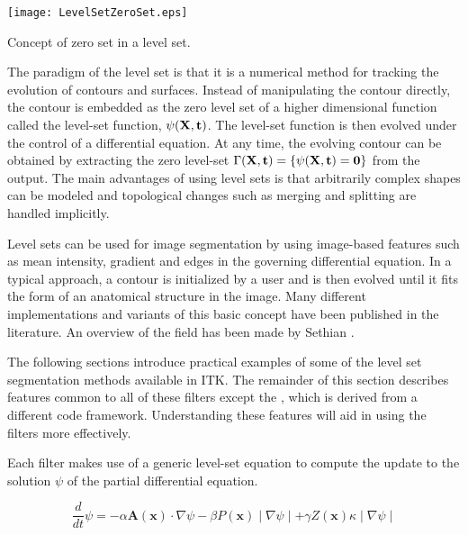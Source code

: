 %
%
%
%
%
%



\begin{floatingfigure}[rlp]{0.5\textwidth}
  \centering
  \texttt{[image: LevelSetZeroSet.eps]}
  \caption[Zero Set Concept]{Concept of zero set in a level set.\label{fig:LevelSetZeroSet}}
\end{floatingfigure}

The paradigm of the level set is that it is a numerical method for tracking
the evolution of contours and surfaces. Instead of manipulating the contour
directly, the contour is embedded as the zero level set of a higher
dimensional function called the level-set function, $\psi(\bf{X},t)$. The
level-set function is then evolved under the control of a differential
equation.  At any time, the evolving contour can be obtained by extracting
the zero level-set $\Gamma(\bf{X},t) =
\{\psi(\bf{X},t) = 0\}$ from the output.  The main advantages of using level
sets is that arbitrarily complex shapes can be modeled and topological
changes such as merging and splitting are handled implicitly.

Level sets can be used for image segmentation by using image-based features
such as mean intensity, gradient and edges in the governing differential
equation.  In a typical approach, a contour is initialized by a user and is
then evolved until it fits the form of an anatomical structure in the image.
Many different implementations and variants of this basic concept have been
published in the literature. An overview of the field has been made by
Sethian \cite{Sethian1996}.

The following sections introduce practical examples of some
of the level set segmentation methods available in ITK.  The remainder of this
section describes features common to all of these filters except the
, which is derived from a different code
framework.  Understanding these features will aid in using the filters
more effectively.

Each filter makes use of a generic level-set equation to compute the update to
the solution $\psi$ of the partial differential equation.

\begin{equation}
\label{eqn:LevelSetEquation}
\frac{d}{dt}\psi = -\alpha \mathbf{A}(\mathbf{x})\cdot\nabla\psi - \beta
  P(\mathbf{x})\mid\nabla\psi\mid +
\gamma Z(\mathbf{x})\kappa\mid\nabla\psi\mid
\end{equation}

